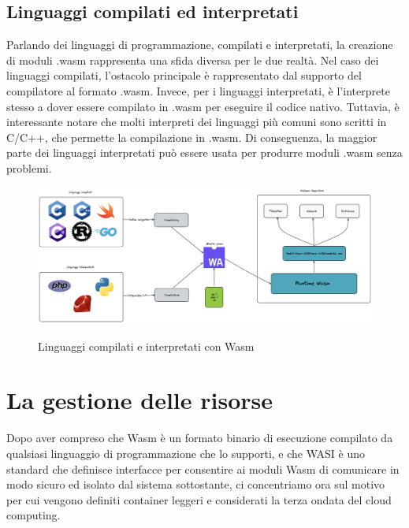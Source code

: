 \subsection{Linguaggi compilati ed interpretati}
Parlando dei linguaggi di programmazione, compilati e interpretati, la creazione di moduli .wasm rappresenta una sfida
diversa per le due realtà. Nel caso dei linguaggi compilati, l'ostacolo principale è rappresentato dal supporto del
compilatore al formato .wasm. Invece, per i linguaggi interpretati, è l'interprete stesso a dover essere compilato in
.wasm per eseguire il codice nativo. Tuttavia, è interessante notare che molti interpreti dei linguaggi più comuni sono
scritti in C/C++, che permette la compilazione in .wasm. Di conseguenza, la maggior parte dei linguaggi interpretati può
essere usata per produrre moduli .wasm senza problemi.

\begin{figure}[H]
    \centering
    \captionsetup{justification=centering}
    \includegraphics[width=15cm]{./chapters/2.wasi-in-depth/images/9.portability_wasm.png}
    \label{wasm_wasi_portability}
    \caption{Linguaggi compilati e interpretati con Wasm}
\end{figure}


\section{La gestione delle risorse}
Dopo aver compreso che Wasm è un formato binario di esecuzione compilato da qualsiasi linguaggio di programmazione che
lo supporti, e che WASI è uno standard che definisce interfacce per consentire ai moduli Wasm di comunicare in modo
sicuro ed isolato dal sistema sottostante, ci concentriamo ora sul motivo per cui vengono definiti container leggeri e
considerati la terza ondata del cloud computing.

